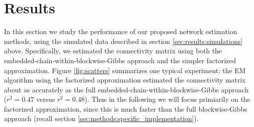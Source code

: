 \documentclass[aoas,preprint]{imsart}
\begin{document}
\section{Results}
\label{sec:results}

In this section we study the performance of our proposed network
estimation methods, using the simulated data described in section
\ref{sec:results:simulations} above.  Specifically, we estimated the
connectivity matrix using both the
embedded-chain-within-blockwise-Gibbs approach and the simpler
factorized approximation.  Figure \ref{fig:scatters} summarizes one
typical experiment: the EM algorithm using the factorized
approximation estimated the connectivity matrix about as accurately as
the full embedded-chain-within-blockwise-Gibbs approach ($r^2=0.47$
versus $r^2=0.48$).  Thus in the following we will focus primiarily on
the factorized approximation, since this is much faster than the full
blockwise-Gibbs approach (recall section
\ref{sec:methods:specific_implementation}).
\end{document}

